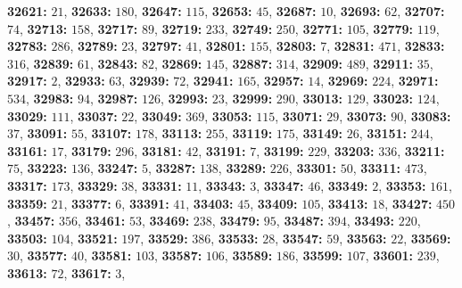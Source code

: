 \textsf{\bfseries 32621:} $21$, \textsf{\bfseries 32633:} $180$, \textsf{\bfseries 32647:} $115$, \textsf{\bfseries 32653:} $45$, \textsf{\bfseries 32687:} $10$, \textsf{\bfseries 32693:} $62$, \textsf{\bfseries 32707:} $74$, \textsf{\bfseries 32713:} $158$, \textsf{\bfseries 32717:} $89$, \textsf{\bfseries 32719:} $233$, \textsf{\bfseries 32749:} $250$, \textsf{\bfseries 32771:} $105$, \textsf{\bfseries 32779:} $119$, \textsf{\bfseries 32783:} $286$, \textsf{\bfseries 32789:} $23$, \textsf{\bfseries 32797:} $41$, \textsf{\bfseries 32801:} $155$, \textsf{\bfseries 32803:} $7$, \textsf{\bfseries 32831:} $471$, \textsf{\bfseries 32833:} $316$, \textsf{\bfseries 32839:} $61$, \textsf{\bfseries 32843:} $82$, \textsf{\bfseries 32869:} $145$, \textsf{\bfseries 32887:} $314$, \textsf{\bfseries 32909:} $489$, \textsf{\bfseries 32911:} $35$, \textsf{\bfseries 32917:} $2$, \textsf{\bfseries 32933:} $63$, \textsf{\bfseries 32939:} $72$, \textsf{\bfseries 32941:} $165$, \textsf{\bfseries 32957:} $14$, \textsf{\bfseries 32969:} $224$, \textsf{\bfseries 32971:} $534$, \textsf{\bfseries 32983:} $94$, \textsf{\bfseries 32987:} $126$, \textsf{\bfseries 32993:} $23$, \textsf{\bfseries 32999:} $290$, \textsf{\bfseries 33013:} $129$, \textsf{\bfseries 33023:} $124$, \textsf{\bfseries 33029:} $111$, \textsf{\bfseries 33037:} $22$, \textsf{\bfseries 33049:} $369$, \textsf{\bfseries 33053:} $115$, \textsf{\bfseries 33071:} $29$, \textsf{\bfseries 33073:} $90$, \textsf{\bfseries 33083:} $37$, \textsf{\bfseries 33091:} $55$, \textsf{\bfseries 33107:} $178$, \textsf{\bfseries 33113:} $255$, \textsf{\bfseries 33119:} $175$, \textsf{\bfseries 33149:} $26$, \textsf{\bfseries 33151:} $244$, \textsf{\bfseries 33161:} $17$, \textsf{\bfseries 33179:} $296$, \textsf{\bfseries 33181:} $42$, \textsf{\bfseries 33191:} $7$, \textsf{\bfseries 33199:} $229$, \textsf{\bfseries 33203:} $336$, \textsf{\bfseries 33211:} $75$, \textsf{\bfseries 33223:} $136$, \textsf{\bfseries 33247:} $5$, \textsf{\bfseries 33287:} $138$, \textsf{\bfseries 33289:} $226$, \textsf{\bfseries 33301:} $50$, \textsf{\bfseries 33311:} $473$, \textsf{\bfseries 33317:} $173$, \textsf{\bfseries 33329:} $38$, \textsf{\bfseries 33331:} $11$, \textsf{\bfseries 33343:} $3$, \textsf{\bfseries 33347:} $46$, \textsf{\bfseries 33349:} $2$, \textsf{\bfseries 33353:} $161$, \textsf{\bfseries 33359:} $21$, \textsf{\bfseries 33377:} $6$, \textsf{\bfseries 33391:} $41$, \textsf{\bfseries 33403:} $45$, \textsf{\bfseries 33409:} $105$, \textsf{\bfseries 33413:} $18$, \textsf{\bfseries 33427:} $450$, \textsf{\bfseries 33457:} $356$, \textsf{\bfseries 33461:} $53$, \textsf{\bfseries 33469:} $238$, \textsf{\bfseries 33479:} $95$, \textsf{\bfseries 33487:} $394$, \textsf{\bfseries 33493:} $220$, \textsf{\bfseries 33503:} $104$, \textsf{\bfseries 33521:} $197$, \textsf{\bfseries 33529:} $386$, \textsf{\bfseries 33533:} $28$, \textsf{\bfseries 33547:} $59$, \textsf{\bfseries 33563:} $22$, \textsf{\bfseries 33569:} $30$, \textsf{\bfseries 33577:} $40$, \textsf{\bfseries 33581:} $103$, \textsf{\bfseries 33587:} $106$, \textsf{\bfseries 33589:} $186$, \textsf{\bfseries 33599:} $107$, \textsf{\bfseries 33601:} $239$, \textsf{\bfseries 33613:} $72$, \textsf{\bfseries 33617:} $3$, 
